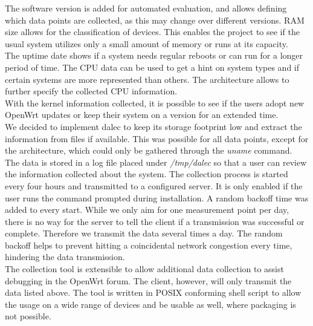     The software version is added for automated evaluation, and allows defining which data points are collected, as this may change over different versions. RAM size allows for the classification of devices. This enables the project to see if the usual system utilizes only a small amount of memory or runs at its capacity.\\
    The uptime date shows if a system needs regular reboots or can run for a longer period of time. The CPU data can be used to get a hint on system types and if certain systems are more represented than others. The architecture allows to further specify the collected CPU information.\\
    With the kernel information collected, it is possible to see if the users adopt new OpenWrt updates or keep their system on a version for an extended time.\\
    
    We decided to implement dalec to keep its storage footprint low and extract the information from files if available. This was possible for all data points, except for the architecture, which could only be gathered through the \textit{uname} command. The data is stored in a log file placed under \textit{/tmp/dalec} so that a user can review the information collected about the system. The collection process is started every four hours and transmitted to a configured server. It is only enabled if the user runs the command prompted during installation. A random backoff time was added to every start. While we only aim for one measurement point per day, there is no way for the server to tell the client if a transmission was successful or complete. Therefore we transmit the data several times a day. The random backoff helps to prevent hitting a coincidental network congestion every time, hindering the data transmission.\\
    The collection tool is extensible to allow additional data collection to assist debugging in the OpenWrt forum. The client, however, will only transmit the data listed above. The tool is written in POSIX conforming shell script to allow the usage on a wide range of devices and be usable as well, where packaging is not possible.
%
